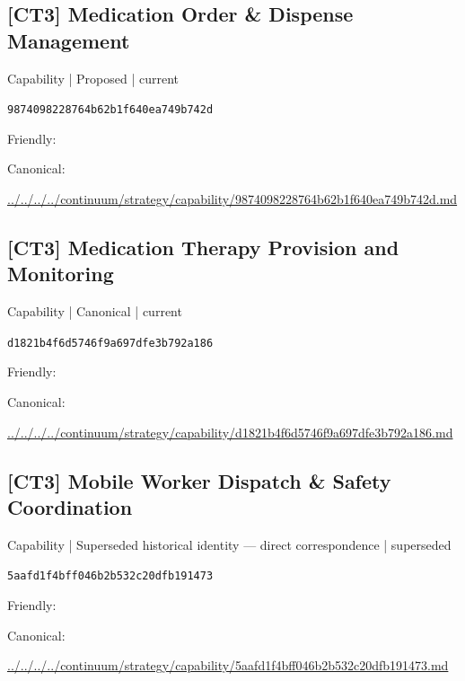\documentclass[10pt,a4paper]{article}
\begin{document}
\subsection*{[CT3] Medication Order \& Dispense Management}
{\small Capability | Proposed | current}\par
\texttt{9874098228764b62b1f640ea749b742d}\par
Friendly: \par
Canonical: \par
{\footnotesize\url{../../../../continuum/strategy/capability/9874098228764b62b1f640ea749b742d.md}}\par
\subsection*{[CT3] Medication Therapy Provision and Monitoring}
{\small Capability | Canonical | current}\par
\texttt{d1821b4f6d5746f9a697dfe3b792a186}\par
Friendly: \par
Canonical: \par
{\footnotesize\url{../../../../continuum/strategy/capability/d1821b4f6d5746f9a697dfe3b792a186.md}}\par
\subsection*{[CT3] Mobile Worker Dispatch \& Safety Coordination}
{\small Capability | Superseded historical identity — direct correspondence | superseded}\par
\texttt{5aafd1f4bff046b2b532c20dfb191473}\par
Friendly: \par
Canonical: \par
{\footnotesize\url{../../../../continuum/strategy/capability/5aafd1f4bff046b2b532c20dfb191473.md}}\par
\end{document}
